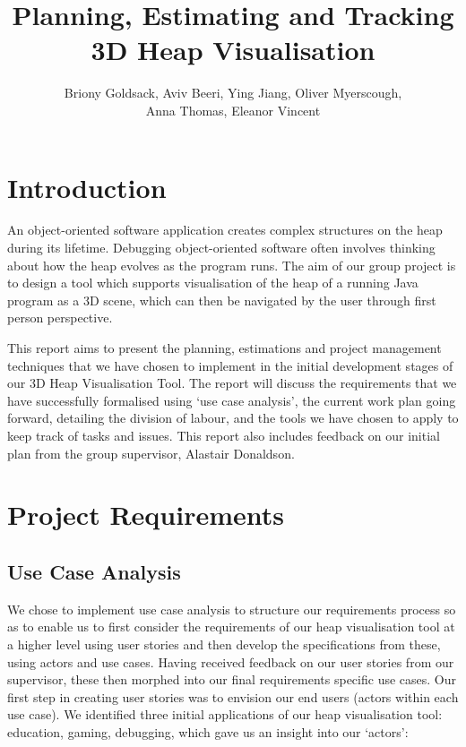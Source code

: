 \documentclass[10pt, a4paper]{article}
\begin{document}
\title{Planning, Estimating and Tracking
\\ 3D Heap Visualisation}
\author{Briony Goldsack, Aviv Beeri, Ying Jiang, Oliver Myerscough, 
\\ Anna Thomas, Eleanor Vincent}
\maketitle

\section{Introduction} 
An object-oriented software application creates complex structures on the heap during its lifetime. Debugging object-oriented software often involves thinking about how the heap evolves as the program runs. The aim of our group project is to design a tool which supports visualisation of the heap of a running Java program as a 3D scene, which can then be navigated by the user through first person perspective. 

This report aims to present the planning, estimations and project management techniques that we have chosen to implement in the initial development stages of our 3D Heap Visualisation Tool. The report will discuss the requirements that we have successfully formalised using ‘use case analysis’, the current work plan going forward, detailing the division of labour, and the tools we have chosen to apply to keep track of tasks and issues. This report also includes feedback on our initial plan from the group supervisor, Alastair Donaldson. 

\section{Project Requirements}

\subsection{Use Case Analysis}

We chose to implement use case analysis to structure our requirements process so as to enable us to first consider the requirements of our heap visualisation tool at a higher level using user stories and then develop the specifications from these, using actors and use cases. Having received feedback on our user stories from our supervisor, these then morphed into our final requirements specific use cases. Our first step in creating user stories was to envision our end users (actors within each use case). We identified three initial applications of our heap visualisation tool: education, gaming, debugging, which gave us an insight into our ‘actors’:
\end{document}
